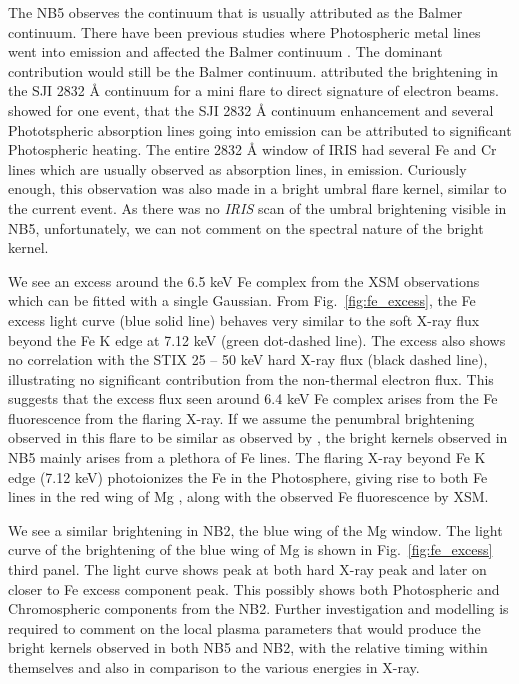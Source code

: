 \documentclass[lineno, pdflatex,sn-mathphys-ay]{sn-jnl}%
\begin{document}
The NB5 observes the continuum that is usually attributed as the Balmer continuum. There have been previous studies where Photospheric metal lines went into emission and affected the Balmer continuum \citep{heinzel14,kleint17}. The dominant contribution would still be the Balmer continuum. \cite{reetika21} attributed the brightening in the SJI 2832 {\AA} continuum for a mini flare to direct signature of electron beams. \cite{kowalski19} showed for one event, that the SJI 2832 {\AA} continuum enhancement and several Phototspheric absorption lines going into emission can be attributed to significant Photospheric heating. The entire 2832 {\AA} window of IRIS had several Fe  and Cr  lines which are usually observed as absorption lines, in emission. Curiously enough, this observation was also made in a bright umbral flare kernel, similar to the current event. As there was no {\it IRIS} scan of the umbral brightening visible in NB5, unfortunately, we can not comment on the spectral nature of the bright kernel.

We see an excess around the 6.5 keV Fe complex from the XSM observations which can be fitted with a single Gaussian. From Fig.~\ref{fig:fe_excess}, the Fe excess light curve (blue solid line) behaves very similar to the soft X-ray flux beyond the Fe K edge at 7.12 keV (green dot-dashed line). The excess also shows no correlation with the STIX 25 {--} 50 keV hard X-ray flux (black dashed line), illustrating no significant contribution from the non-thermal electron flux. This suggests that the excess flux seen around 6.4 keV Fe complex arises from the Fe fluorescence from the flaring X-ray. If we assume the penumbral brightening observed in this flare to be similar as observed by \cite{kowalski19}, the bright kernels observed in NB5 mainly arises from a plethora of Fe  lines. The flaring X-ray beyond Fe K edge (7.12 keV) photoionizes the Fe in the Photosphere, giving rise to both Fe  lines in the red wing of Mg , along with the observed Fe fluorescence by XSM. 

We see a similar brightening in NB2, the blue wing of the Mg window. The light curve of the brightening of the blue wing of Mg is shown in Fig.~\ref{fig:fe_excess} third panel. The light curve shows peak at both hard X-ray peak and later on closer to Fe excess component peak. This possibly shows both Photospheric and Chromospheric components from the NB2. Further investigation and modelling is required to comment on the local plasma parameters that would produce the bright kernels observed in both NB5 and NB2, with the relative timing within themselves and also in comparison to the various energies in X-ray.
\end{document}

